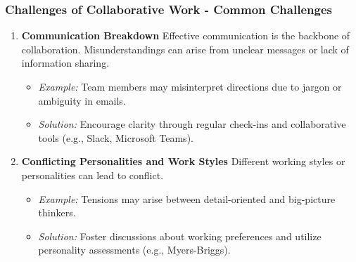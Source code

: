 \documentclass[aspectratio=169]{beamer}
\begin{document}
\begin{frame}[fragile]
  \frametitle{Challenges of Collaborative Work - Common Challenges}
  \begin{enumerate}
    \item \textbf{Communication Breakdown}  
      Effective communication is the backbone of collaboration. Misunderstandings can arise from unclear messages or lack of information sharing.
      \begin{itemize}
        \item \textit{Example:} Team members may misinterpret directions due to jargon or ambiguity in emails.
        \item \textit{Solution:} Encourage clarity through regular check-ins and collaborative tools (e.g., Slack, Microsoft Teams).
      \end{itemize}
      
    \item \textbf{Conflicting Personalities and Work Styles}  
      Different working styles or personalities can lead to conflict.
      \begin{itemize}
        \item \textit{Example:} Tensions may arise between detail-oriented and big-picture thinkers.
        \item \textit{Solution:} Foster discussions about working preferences and utilize personality assessments (e.g., Myers-Briggs).
      \end{itemize}
  \end{enumerate}
\end{frame}
\end{document}
